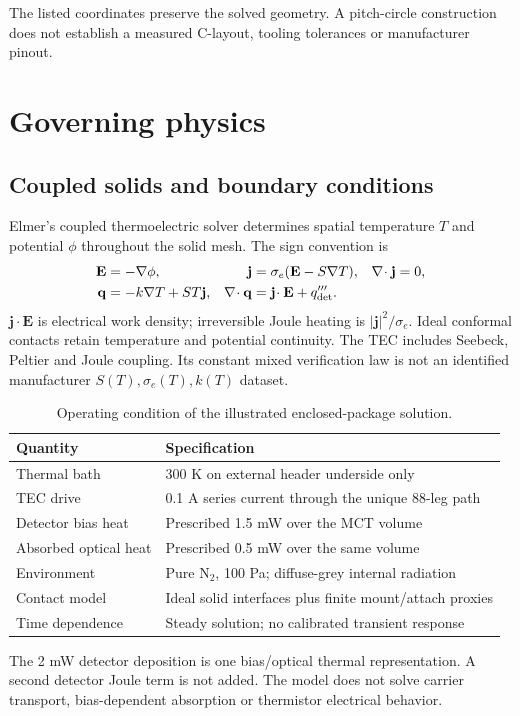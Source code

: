 \documentclass[11pt,a4paper]{article}
\begin{document}
The listed coordinates preserve the solved geometry. A pitch-circle construction
does not establish a measured C-layout, tooling tolerances or manufacturer pinout.
\clearpage
\section{Governing physics}
\subsection{Coupled solids and boundary conditions}
Elmer's coupled thermoelectric solver determines spatial temperature $T$ and
potential $\phi$ throughout the solid mesh. The sign convention is
\begin{align}
\mathbf E&=-\nabla\phi,&\mathbf j&=\sigma_e(\mathbf E-S\nabla T),&
\nabla\!\cdot\mathbf j&=0,\\
\mathbf q&=-k\nabla T+ST\mathbf j,&
\nabla\!\cdot\mathbf q&=\mathbf j\!\cdot\mathbf E+q'''_{\rm det}.
\end{align}
$\mathbf j\cdot\mathbf E$ is electrical work density; irreversible Joule
heating is $|\mathbf j|^2/\sigma_e$. Ideal conformal contacts retain temperature
and potential continuity. The TEC includes Seebeck, Peltier and Joule coupling.
Its constant mixed verification law is not an identified manufacturer
$S(T),\sigma_e(T),k(T)$ dataset.

\begin{table}[!ht]\centering\caption{Operating condition of the illustrated enclosed-package solution.}
\begin{tabularx}{\linewidth}{lX}\toprule Quantity & Specification\\\midrule
Thermal bath & 300 K on external header underside only\\
TEC drive & 0.1 A series current through the unique 88-leg path\\
Detector bias heat & Prescribed 1.5 mW over the MCT volume\\
Absorbed optical heat & Prescribed 0.5 mW over the same volume\\
Environment & Pure N$_2$, 100 Pa; diffuse-grey internal radiation\\
Contact model & Ideal solid interfaces plus finite mount/attach proxies\\
Time dependence & Steady solution; no calibrated transient response\\\bottomrule
\end{tabularx}\end{table}
The 2 mW detector deposition is one bias/optical thermal representation.
A second detector Joule term is not added. The model does not solve carrier
transport, bias-dependent absorption or thermistor electrical behavior.
\end{document}
